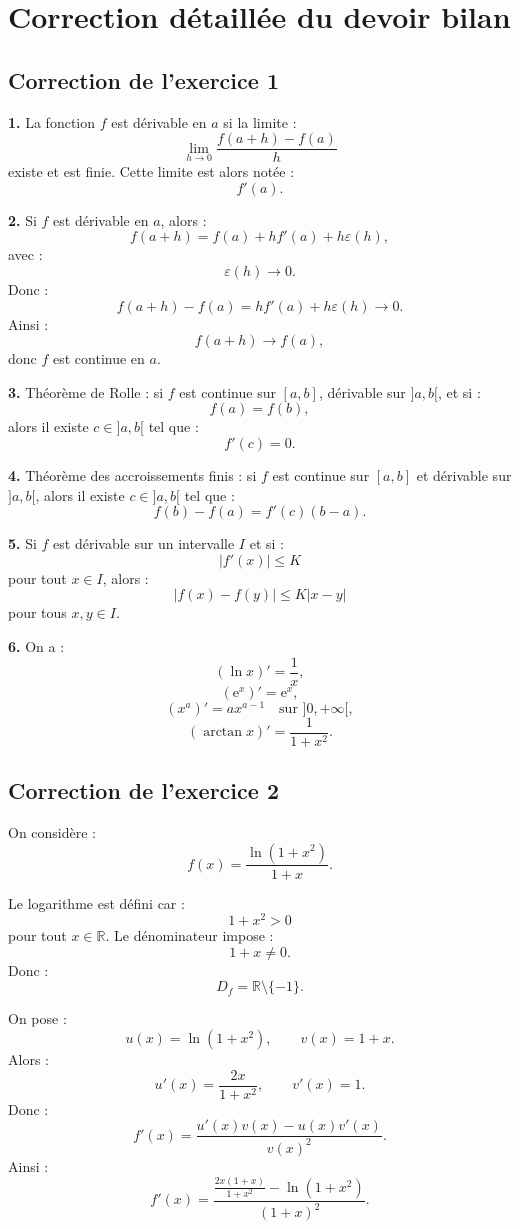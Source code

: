 \documentclass[11pt,a4paper]{article}
\newcommand{\R}{\mathbb R}
\newcommand{\e}{\mathrm e}
\begin{document}
\section{Correction détaillée du devoir bilan}

\subsection*{Correction de l'exercice 1}

\textbf{1.}  
La fonction \(f\) est dérivable en \(a\) si la limite :
\[
\lim_{h\to0}\frac{f(a+h)-f(a)}{h}
\]
existe et est finie.  
Cette limite est alors notée :
\[
f'(a).
\]

\textbf{2.}  
Si \(f\) est dérivable en \(a\), alors :
\[
f(a+h)=f(a)+hf'(a)+h\varepsilon(h),
\]
avec :
\[
\varepsilon(h)\to0.
\]
Donc :
\[
f(a+h)-f(a)=hf'(a)+h\varepsilon(h)\to0.
\]
Ainsi :
\[
f(a+h)\to f(a),
\]
donc \(f\) est continue en \(a\).

\textbf{3.}  
Théorème de Rolle : si \(f\) est continue sur \([a,b]\), dérivable sur \(]a,b[\), et si :
\[
f(a)=f(b),
\]
alors il existe \(c\in]a,b[\) tel que :
\[
f'(c)=0.
\]

\textbf{4.}  
Théorème des accroissements finis : si \(f\) est continue sur \([a,b]\) et dérivable sur \(]a,b[\), alors il existe \(c\in]a,b[\) tel que :
\[
f(b)-f(a)=f'(c)(b-a).
\]

\textbf{5.}  
Si \(f\) est dérivable sur un intervalle \(I\) et si :
\[
|f'(x)|\leq K
\]
pour tout \(x\in I\), alors :
\[
|f(x)-f(y)|\leq K|x-y|
\]
pour tous \(x,y\in I\).

\textbf{6.}  
On a :
\[
(\ln x)'=\frac1x,
\]
\[
(\e^x)'=\e^x,
\]
\[
(x^a)'=ax^{a-1}
\quad\text{sur } ]0,+\infty[,
\]
\[
(\arctan x)'=\frac1{1+x^2}.
\]

\subsection*{Correction de l'exercice 2}

On considère :
\[
f(x)=\frac{\ln(1+x^2)}{1+x}.
\]

Le logarithme est défini car :
\[
1+x^2>0
\]
pour tout \(x\in\R\).  
Le dénominateur impose :
\[
1+x\neq0.
\]
Donc :
\[
D_f=\R\setminus\{-1\}.
\]

On pose :
\[
u(x)=\ln(1+x^2),
\qquad
v(x)=1+x.
\]
Alors :
\[
u'(x)=\frac{2x}{1+x^2},
\qquad
v'(x)=1.
\]
Donc :
\[
f'(x)=\frac{u'(x)v(x)-u(x)v'(x)}{v(x)^2}.
\]
Ainsi :
\[
f'(x)=
\frac{\frac{2x(1+x)}{1+x^2}-\ln(1+x^2)}
{(1+x)^2}.
\]
\end{document}
